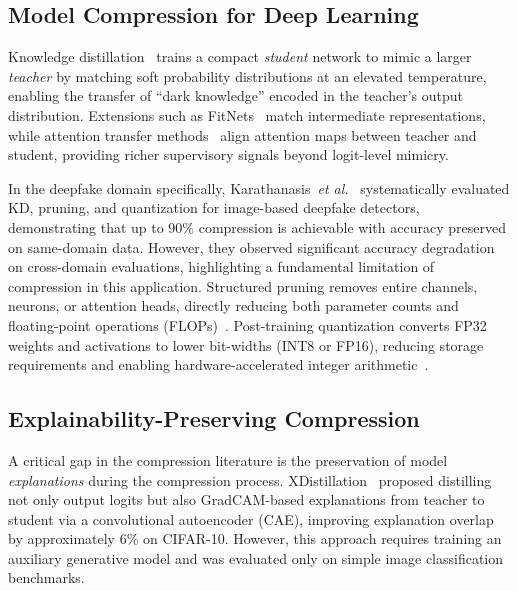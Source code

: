 \documentclass[lettersize,journal]{IEEEtran}
\begin{document}
\subsection{Model Compression for Deep Learning}

Knowledge distillation~\cite{hinton2015distilling} trains a compact \emph{student} network to mimic a larger \emph{teacher} by matching soft probability distributions at an elevated temperature, enabling the transfer of ``dark knowledge'' encoded in the teacher's output distribution. Extensions such as FitNets~\cite{romero2015fitnets} match intermediate representations, while attention transfer methods~\cite{zagoruyko2017paying} align attention maps between teacher and student, providing richer supervisory signals beyond logit-level mimicry.

In the deepfake domain specifically, Karathanasis~\textit{et al.}~\cite{karathanasis2025compression} systematically evaluated KD, pruning, and quantization for image-based deepfake detectors, demonstrating that up to 90\% compression is achievable with accuracy preserved on same-domain data. However, they observed significant accuracy degradation on cross-domain evaluations, highlighting a fundamental limitation of compression in this application. Structured pruning removes entire channels, neurons, or attention heads, directly reducing both parameter counts and floating-point operations (FLOPs)~\cite{malik2025pruning}. Post-training quantization converts FP32 weights and activations to lower bit-widths (INT8 or FP16), reducing storage requirements and enabling hardware-accelerated integer arithmetic~\cite{jacob2018quantization}.

\subsection{Explainability-Preserving Compression}

A critical gap in the compression literature is the preservation of model \emph{explanations} during the compression process. XDistillation~\cite{alharbi2021xdistillation} proposed distilling not only output logits but also GradCAM-based explanations from teacher to student via a convolutional autoencoder (CAE), improving explanation overlap by approximately 6\% on CIFAR-10. However, this approach requires training an auxiliary generative model and was evaluated only on simple image classification benchmarks.
\end{document}
